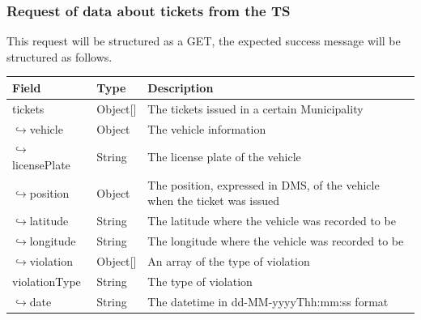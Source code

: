 				\subsubsection{Request of data about tickets from the TS}
					This request will be structured as a GET, the expected success message will be structured as follows.
					\begin{table}[!h]
						\begin{tabular}{L{0.3\textwidth}L{0.15\textwidth}L{0.43\textwidth}}
							\toprule
							\textbf{Field} & \textbf{Type} & \textbf{Description} \\
							\midrule
							tickets & Object[] & The tickets issued in a certain Municipality \\
							\hspace{2.5mm}$\hookrightarrow$vehicle & Object & The vehicle information \\
							\hspace{6.5mm}$\hookrightarrow$licensePlate & String & The license plate of the vehicle \\
							\hspace{2.5mm}$\hookrightarrow$position & Object & The position, expressed in DMS, of the vehicle when the ticket was issued  \\
							\hspace{6.5mm}$\hookrightarrow$latitude & String & The latitude where the vehicle was recorded to be \\
							\hspace{6.5mm}$\hookrightarrow$longitude & String & The longitude where the vehicle was recorded to be \\
							\hspace{2.5mm}$\hookrightarrow$violation & Object[] & An array of the type of violation \\
							\hspace{5mm}violationType & String & The type of violation \\
							\hspace{2.5mm}$\hookrightarrow$date & String & The datetime in \newline dd-MM-yyyyThh:mm:ss format \\								 	\bottomrule
								\end{tabular}
							\end{table}
